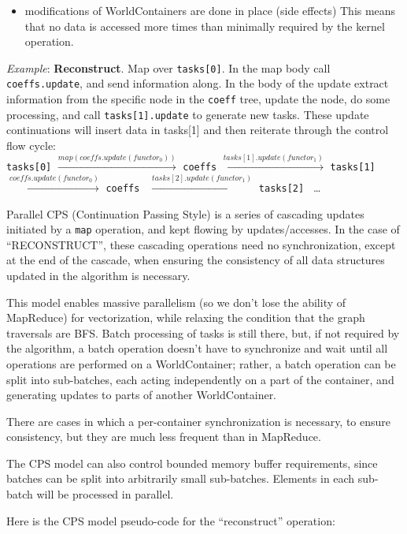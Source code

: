 \documentclass{article}
\begin{document}
\begin{enumerate}
\begin{itemize}
      \item modifications of WorldContainers are done in place (side
effects) This means that no data is accessed more times than minimally required
by the kernel operation.

  \end{itemize}

{\em Example}: {\bf Reconstruct}. Map over {\tt tasks[0]}. In the map
body call {\tt coeffs.update}, and send information along. In the body of the
update extract information from the specific node in the {\tt coeff} tree, update
the node, do some processing, 
and call {\tt tasks[1].update} to generate new tasks. These update continuations
will insert data in tasks[1] and then reiterate through the control flow cycle:\\

{\tt tasks[0]} $\xrightarrow{map(coeffs.update(functor_0))}$ {\tt coeffs}
$\xrightarrow{tasks[1].update(functor_1)}$ {\tt tasks[1] } 
$\xrightarrow{coeffs.update(functor_0)}$ {\tt coeffs } 
$\xrightarrow{tasks[2].update(functor_1)}$ {\tt tasks[2] } \dots

Parallel CPS (Continuation Passing Style) is a series of cascading updates
initiated by a {\tt map} operation, and kept flowing by updates/accesses. 
In the case of ``RECONSTRUCT'', these cascading operations need no synchronization,
except at the end of the cascade, when ensuring the consistency of all data
structures updated in the algorithm is necessary.

This model enables massive parallelism (so we don't lose the ability of MapReduce)
for vectorization, while relaxing the condition that the graph traversals are BFS.
Batch processing of tasks is still there, but, if not required by the algorithm,
a batch operation doesn't have to synchronize and wait until all operations are
performed on a WorldContainer; rather, a batch operation
can be split into sub-batches, each acting independently on a part of 
the container, and generating updates to parts of another WorldContainer.

There are cases in which a per-container synchronization is necessary, to
ensure consistency, but they are much less frequent than in MapReduce.

The CPS model can also control bounded memory buffer requirements, since
batches can be split into arbitrarily small sub-batches. Elements in 
each sub-batch will be processed in parallel. 

Here is the CPS model pseudo-code for the ``reconstruct'' operation:


\end{enumerate}
\end{document}
